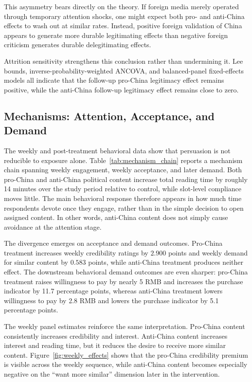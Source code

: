 \documentclass[12pt,american]{article}
\begin{document}
	
	
	This asymmetry bears directly on the theory. If foreign media merely operated through temporary attention shocks, one might expect both pro- and anti-China effects to wash out at similar rates. Instead, positive foreign validation of China appears to generate more durable legitimating effects than negative foreign criticism generates durable delegitimating effects.
	
	Attrition sensitivity strengthens this conclusion rather than undermining it. Lee bounds, inverse-probability-weighted ANCOVA, and balanced-panel fixed-effects models all indicate that the follow-up pro-China legitimacy effect remains positive, while the anti-China follow-up legitimacy effect remains close to zero.
	
	\subsection*{Mechanisms: Attention, Acceptance, and Demand}
	
	The weekly and post-treatment behavioral data show that persuasion is not reducible to exposure alone. Table~\ref{tab:mechanism_chain} reports a mechanism chain spanning weekly engagement, weekly acceptance, and later demand. Both pro-China and anti-China political content increase total reading time by roughly 14 minutes over the study period relative to control, while slot-level compliance moves little. The main behavioral response therefore appears in how much time respondents devote once they engage, rather than in the simple decision to open assigned content. In other words, anti-China content does not simply cause avoidance at the attention stage.
	
	The divergence emerges on acceptance and demand outcomes. Pro-China treatment increases weekly credibility ratings by \(2.900\) points and weekly demand for similar content by \(0.583\) points, while anti-China treatment produces neither effect. The downstream behavioral demand outcomes are even sharper: pro-China treatment raises willingness to pay by nearly 5 RMB and increases the purchase indicator by 11.7 percentage points, whereas anti-China treatment lowers willingness to pay by 2.8 RMB and lowers the purchase indicator by 5.1 percentage points.
	
	
	
	The weekly panel estimates reinforce the same interpretation. Pro-China content consistently increases credibility and interest. Anti-China content increases interest and reading time, but it reduces the desire to receive more similar content. Figure~\ref{fig:weekly_effects} shows that the pro-China credibility premium is visible across the weekly sequence, while anti-China content becomes especially negative on the ``want more similar'' dimension later in the intervention.
	
\end{document}
